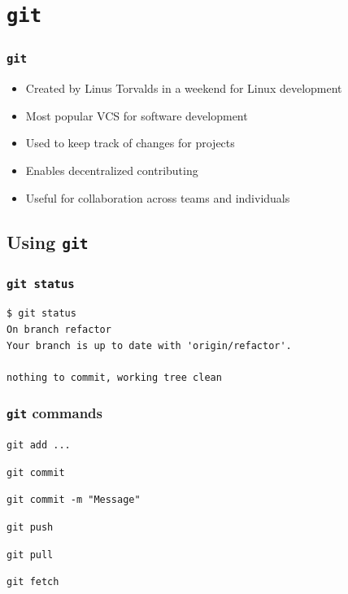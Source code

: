 \documentclass[presentation]{beamer}
\begin{document}
  \section{\texttt{git}}
  \begin{frame}
    \frametitle{\texttt{git}}
 
    \begin{itemize}
      \item Created by Linus Torvalds in a weekend for Linux development
      \item Most popular VCS for software development
      \item Used to keep track of changes for projects
      \item Enables decentralized contributing
      \item Useful for collaboration across teams and individuals
    \end{itemize}
  \end{frame}

  \subsection{Using \texttt{git}}
  \begin{frame}[fragile]
    \frametitle{\texttt{git status}}
 
    \begin{lstlisting}
$ git status
On branch refactor
Your branch is up to date with 'origin/refactor'.

nothing to commit, working tree clean
    \end{lstlisting}
  \end{frame}
  \begin{frame}
    \frametitle{\texttt{git} commands}

    \begin{description}
      \item \texttt{git add ...}    
      \item \texttt{git commit}
      \item \texttt{git commit -m "Message"}    
      \item \texttt{git push}
      \item \texttt{git pull}
      \item \texttt{git fetch}
    \end{description}
  \end{frame}
\end{document}
